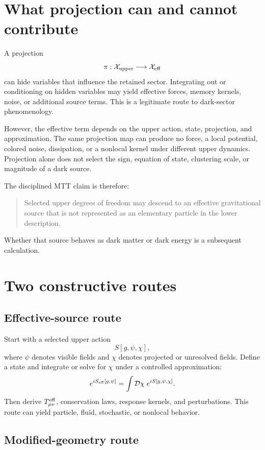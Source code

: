 \documentclass[11pt]{article}
\begin{document}
\section{What projection can and cannot contribute}

A projection
\[
 \pi:\mathcal X_{\rm upper}\longrightarrow\mathcal X_{\rm eff}
\]
can hide variables that influence the retained sector. Integrating out or
conditioning on hidden variables may yield effective forces, memory kernels,
noise, or additional source terms. This is a legitimate route to dark-sector
phenomenology.

However, the effective term depends on the upper action, state, projection,
and approximation. The same projection map can produce no force, a local
potential, colored noise, dissipation, or a nonlocal kernel under different
upper dynamics. Projection alone does not select the sign, equation of state,
clustering scale, or magnitude of a dark source.

The disciplined MTT claim is therefore:
\begin{quote}
Selected upper degrees of freedom may descend to an effective gravitational
source that is not represented as an elementary particle in the lower
description.
\end{quote}
Whether that source behaves as dark matter or dark energy is a subsequent
calculation.

\section{Two constructive routes}

\subsection{Effective-source route}

Start with a selected upper action
\[
 S[g,\psi,\chi],
\]
where \(\psi\) denotes visible fields and \(\chi\) denotes projected or
unresolved fields. Define a state and integrate or solve for \(\chi\) under a
controlled approximation:
\[
 e^{iS_{\rm eff}[g,\psi]}
 =\int\mathcal D\chi\;e^{iS[g,\psi,\chi]}.
\]
Then derive \(T^{\rm eff}_{\mu\nu}\), conservation laws, response kernels,
and perturbations. This route can yield particle, fluid, stochastic, or
nonlocal behavior.

\subsection{Modified-geometry route}
\end{document}
